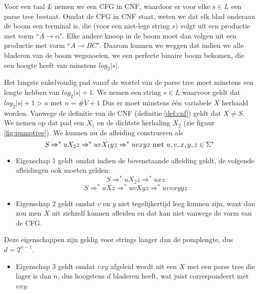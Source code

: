   Voor een taal $L$ nemen we een CFG in CNF, waardoor er voor elke $s \in L$ een parse tree bestaat. Omdat de CFG in CNF staat, weten we dat elk blad onderaan de boom een terminal is, die (voor een niet-lege string $s$) volgt uit een productie met vorm ``$A \rightarrow \alpha$". Elke andere knoop in de boom moet dan volgen uit een productie met vorm ``$A \rightarrow BC$". Daarom kunnen we weggen dat indien we alle bladeren van de boom wegsnoeien, we een perfecte binaire boom bekomen, die een hoogte heeft van minstens $log_2|s|$.
  
  Het langste enkelvoudig pad vanaf de wortel van de parse tree moet minstens een lengte hebben van $log_2|s| + 1$. We nemen een string $s \in L$ waarvoor geldt dat $log_2|s| + 1 > n$ met $n = \#V + 1$ Dus er moet minstens \'e\'en variabele $X$ herhaald worden. Vanwege de definitie van de CNF (definitie \ref{def:cnf}) geldt dat $X \neq S$. We nemen op dat pad een $X_1$ en de dichtste herhaling $X_2$ (zie figuur \ref{fig:pumptree}). We kunnen nu de afleiding construeren als
  \begin{equation*}
  S \Rightarrow^* uX_2z \Rightarrow^* uvX_1yz \Rightarrow^* uvxyz \text{ met }u,v,x,y,z \in \Sigma^*
  \end{equation*}
  
  \begin{itemize}
  \item Eigenschap 1 geldt omdat indien de bovenstaande afleiding geldt, de volgende afleidingen ook moeten gelden:
  \begin{equation*}
  S \Rightarrow^* uX_2z \Rightarrow^* uxz
  \end{equation*}
  \begin{equation*}
  S \Rightarrow^* uXz \Rightarrow^* uvXyz \Rightarrow^* uvvxyyz
  \end{equation*}
  \item Eigenschap 2 geldt omdat $v$ en $y$ niet tegelijkertijd leeg kunnen zijn, want dan zou men $X$ uit zichzelf kunnen afleiden en dat kan niet vanwege de vorm van de CFG.
  \end{itemize}
  
  Deze eigenschappen zijn geldig voor strings langer dan de pomplengte, dus $d = 2^{n-1}$.
  
  \begin{itemize}
  \item Eigenschap 3 geldt omdat $vxy$ afgeleid wordt uit een $X$ met een parse tree die lager is dan $n$, dus hoogstens $d$ bladeren heeft, wat juist correspondeert met $vxy$.
  \end{itemize}